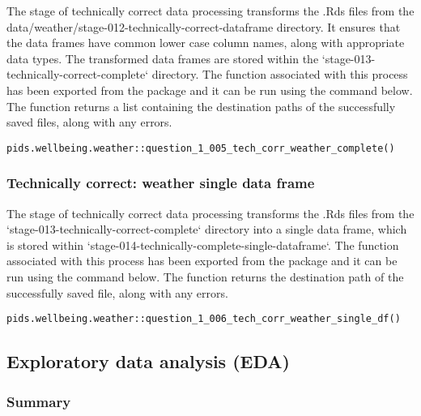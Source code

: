 \documentclass[12pt, oneside, openany]{book}
\begin{document}
The stage of technically correct data processing transforms the .Rds files from the data/weather/stage-012-technically-correct-dataframe directory. It ensures that the data frames have common lower case column names, along with appropriate data types. The transformed data frames are stored within the `stage-013-technically-correct-complete` directory. The function associated with this process has been exported from the package and it can be run using the command below. The function returns a list containing the destination paths of the successfully saved files, along with any errors.

\begin{verbatim}
pids.wellbeing.weather::question_1_005_tech_corr_weather_complete()
\end{verbatim}

\subsubsection*{Technically correct: weather single data frame}

The stage of technically correct data processing transforms the .Rds files from the `stage-013-technically-correct-complete` directory into a single data frame, which is stored within `stage-014-technically-complete-single-dataframe`. The function associated with this process has been exported from the package and it can be run using the command below. The function returns the destination path of the successfully saved file, along with any errors.

\begin{verbatim}
pids.wellbeing.weather::question_1_006_tech_corr_weather_single_df()
\end{verbatim}

\subsection*{Exploratory data analysis (EDA)}

\subsubsection*{Summary}
\end{document}
